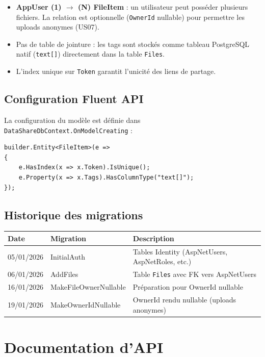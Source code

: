 \documentclass[12pt,a4paper]{article}
\begin{document}
\begin{itemize}[nosep]
  \item \textbf{AppUser (1) $\rightarrow$ (N) FileItem} : un utilisateur peut poss\'eder plusieurs fichiers. La relation est optionnelle (\texttt{OwnerId} nullable) pour permettre les uploads anonymes (US07).
  \item Pas de table de jointure : les tags sont stock\'es comme tableau PostgreSQL natif (\texttt{text[]}) directement dans la table \texttt{Files}.
  \item L'index unique sur \texttt{Token} garantit l'unicit\'e des liens de partage.
\end{itemize}

\subsection{Configuration Fluent API}

La configuration du mod\`ele est d\'efinie dans \texttt{DataShareDbContext.OnModelCreating} :

\begin{lstlisting}
builder.Entity<FileItem>(e =>
{
    e.HasIndex(x => x.Token).IsUnique();
    e.Property(x => x.Tags).HasColumnType("text[]");
});
\end{lstlisting}

\subsection{Historique des migrations}

\begin{longtable}{p{2cm} p{5cm} p{7.5cm}}
\toprule
\textbf{Date} & \textbf{Migration} & \textbf{Description} \\
\midrule
\endhead
05/01/2026 & InitialAuth & Tables Identity (AspNetUsers, AspNetRoles, etc.) \\
06/01/2026 & AddFiles & Table \texttt{Files} avec FK vers AspNetUsers \\
16/01/2026 & MakeFileOwnerNullable & Pr\'eparation pour OwnerId nullable \\
19/01/2026 & MakeOwnerIdNullable & OwnerId rendu nullable (uploads anonymes) \\
\bottomrule
\end{longtable}

\section{Documentation d'API}
\end{document}
